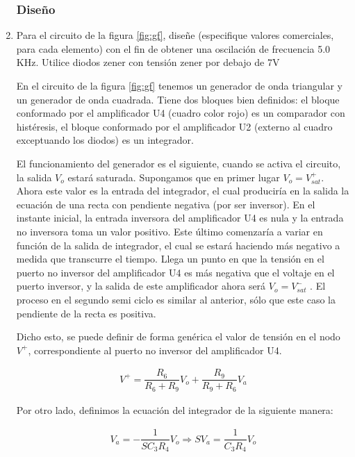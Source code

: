         \begin{enumerate}
            \subsubsection{Diseño}
            \item Para el circuito de la figura \ref{fig:gf}, diseñe (especifique valores comerciales, para cada elemento) con el fin de obtener una oscilación de frecuencia 5.0 KHz. Utilice diodos zener con tensión zener por debajo de 7V

                En el circuito de la figura \ref{fig:gf} tenemos un generador de onda triangular y un generador de onda cuadrada. Tiene dos bloques bien definidos: el bloque conformado por el amplificador U4 (cuadro color rojo) es un comparador con histéresis, el bloque conformado por el amplificador U2 (externo al cuadro exceptuando los diodos) es un integrador. 
                
                El funcionamiento del generador es el siguiente, cuando se activa el circuito, la salida $V_o$ estará saturada. Supongamos que en primer lugar $V_o=V_{sat}^+$. Ahora este valor es la entrada del integrador, el cual produciría en la salida la ecuación de una recta con pendiente negativa (por ser inversor). En el instante inicial, la entrada inversora del amplificador U4 es nula y la entrada no inversora toma un valor positivo. Este último comenzaría a variar en función de la salida de integrador, el cual se estará haciendo más negativo a medida que transcurre el tiempo. Llega un punto en que la tensión en el puerto no inversor del amplificador U4 es más negativa que el voltaje en el puerto inversor, y la salida de este amplificador ahora será $V_o=V_{sat}^-$ . El proceso en el segundo semi ciclo es similar al anterior, sólo que este caso la pendiente de la recta es positiva. 
                
                Dicho esto, se puede definir de forma genérica el valor de tensión en el nodo $V^+$, correspondiente al puerto no inversor del amplificador U4.

                \begin{gather}
                    V^+=\dfrac{R_6}{R_6+R_9}V_o+\dfrac{R_9}{R_9+R_6}V_a \label{eqn:v+}
                \end{gather}

                Por otro lado, definimos la ecuación del integrador de la siguiente manera:

                \begin{gather}
                    V_a=-\dfrac{1}{SC_3R_4}V_o \Rightarrow SV_a=\dfrac{1}{C_3R_4}V_o \label{sva}
                \end{gather}


\end{enumerate}
